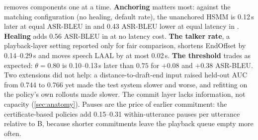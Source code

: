  removes components one at a time.
\textbf{Anchoring} matters most: against the matching configuration (no healing, default rate), the unanchored HSMM is 0.12\,s later at equal ASR-BLEU in \enzh{} and 0.43 ASR-BLEU lower at equal latency in \zhen{}.
\textbf{Healing} adds 0.56 ASR-BLEU in \enzh{} at no latency cost.
\textbf{The talker rate}, a playback-layer setting reported only for fair comparison, shortens EndOffset by 0.14--0.29\,s and moves speech LAAL by at most 0.02\,s.
\textbf{The threshold} trades as expected: $\theta = 0.80$ is 0.10--0.13\,s later than $0.75$ for $+0.08$ and $+0.38$ ASR-BLEU.
Two extensions did not help: a distance-to-draft-end input raised held-out AUC from 0.744 to 0.766 yet made the test system slower and worse, and refitting on the policy's own rollouts made \zhen{} slower.
The commit layer lacks information, not capacity (\cref{sec:anatomy}).
Pauses are the price of earlier commitment: the certificate-based policies add 0.15--0.31 within-utterance pauses per utterance relative to B, because shorter commitments leave the playback queue empty more often.
